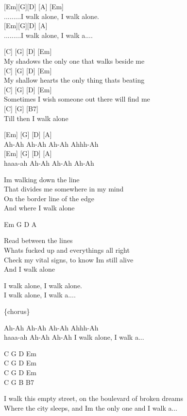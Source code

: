 \documentclass[
  letterpaper,
]{scrbook}
\begin{document}
{[}Em{]}{[}G{]}{[}D{]} {[}A{]} {[}Em{]}\\
.........I walk alone, I walk alone.\\
{[}Em{]}{[}G{]}{[}D{]} {[}A{]}\\
.........I walk alone, I walk a....

{[}C{]} {[}G{]} {[}D{]} {[}Em{]}\\
My shadow\textquotesingle s the only one that walks beside me\\
{[}C{]} {[}G{]} {[}D{]} {[}Em{]}\\
My shallow heart\textquotesingle s the only thing that\textquotesingle s
beating\\
{[}C{]} {[}G{]} {[}D{]} {[}Em{]}\\
Sometimes I wish someone out there will find me\\
{[}C{]} {[}G{]} {[}B7{]}\\
Till then I walk alone

{[}Em{]} {[}G{]} {[}D{]} {[}A{]}\\
Ah-Ah Ah-Ah Ah-Ah Ahhh-Ah\\
{[}Em{]} {[}G{]} {[}D{]} {[}A{]}\\
haaa-ah Ah-Ah Ah-Ah Ah-Ah

I\textquotesingle m walking down the line\\
That divides me somewhere in my mind\\
On the border line of the edge\\
And where I walk alone

Em G D A

Read between the lines\\
What\textquotesingle s fucked up and everything\textquotesingle s all
right\\
Check my vital signs, to know I\textquotesingle m still alive\\
And I walk alone

I walk alone, I walk alone.\\
I walk alone, I walk a....

\{chorus\}

Ah-Ah Ah-Ah Ah-Ah Ahhh-Ah\\
haaa-ah Ah-Ah Ah-Ah I walk alone, I walk a...

C G D Em\\
C G D Em\\
C G D Em\\
C G B B7

I walk this empty street, on the boulevard of broken dreams\\
Where the city sleeps, and I\textquotesingle m the only one and I walk
a...
\end{document}
